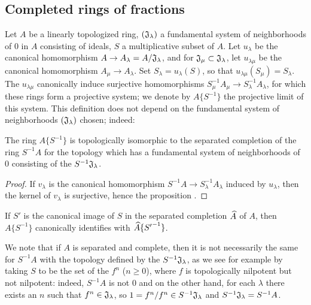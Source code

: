 \subsection{Completed rings of fractions}
\label{subsection-completed-rings-of-fractions}

\begin{env}[7.6.1]
\label{0.7.6.1}
Let $A$ be a linearly topologized ring, $(\mathfrak{J}_\lambda)$ a fundamental system of
neighborhoods of $0$ in $A$ consisting of ideals, $S$ a multiplicative subset of $A$. Let
$u_\lambda$ be the canonical homomorphism $A\to A_\lambda=A/\fk{J}_\lambda$, and for
$\mathfrak{J}_\mu\subset\mathfrak{J}_\lambda$, let $u_{\lambda\mu}$ be the canonical
homomorphism $A_\mu\to A_\lambda$. Set $S_\lambda=u_\lambda(S)$, so that
$u_{\lambda\mu}(S_\mu)=S_\lambda$. The $u_{\lambda\mu}$ canonically induce surjective
homomorphisms $S_\mu^{-1}A_\mu\to S_\lambda^{-1}A_\lambda$, for which these rings form a
projective system; we denote by $A\{S^{-1}\}$ the projective limit of this system. This
definition does not depend on the fundamental system of neighborhoods $(\mathfrak{J}_\lambda)$
chosen; indeed:
\end{env}

\begin{prop}[7.6.2]
\label{0.7.6.2}
The ring $A\{S^{-1}\}$ is topologically isomorphic to the separated completion of the ring
$S^{-1}A$ for the topology which has a fundamental system of neighborhoods of $0$ consisting of
the $S^{-1}\mathfrak{J}_\lambda$.
\end{prop}

\begin{proof}
\label{proof-0.7.6.2}
If $v_\lambda$ is the canonical homomorphism $S^{-1}A\to S_\lambda^{-1}A_\lambda$ induced
by $u_\lambda$, then the kernel of $v_\lambda$ is surjective, hence the proposition .
\end{proof}

\begin{cor}[7.6.3]
\label{0.7.6.3}
If $S'$ is the canonical image of $S$ in the separated completion $\widehat{A}$ of $A$, then
$A\{S^{-1}\}$ canonically identifies with $\widehat{A}\{{S'}^{-1}\}$.
\end{cor}

We note that if $A$ is separated and complete, then it is not necessarily the same for
$S^{-1}A$ with the topology defined by the $S^{-1}\mathfrak{J}_\lambda$, as we see for example
by taking $S$ to be the set of the $f^n$ ($n\geqslant 0$), where $f$ is topologically nilpotent
but not nilpotent: indeed, $S^{-1}A$ is not $0$ and on the other hand, for each $\lambda$ there
exists an $n$ such that $f^n\in\mathfrak{J}_\lambda$, so $1=f^n/f^n\in S^{-1}\mathfrak{J}_\lambda$
and $S^{-1}\mathfrak{J}_\lambda=S^{-1}A$.

